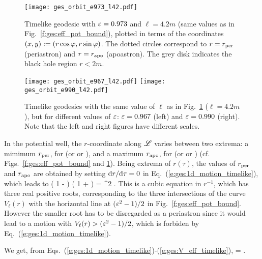 \begin{figure}
\centerline{\texttt{[image: ges\_orbit\_e973\_l42.pdf]}}
\caption[]{\label{f:ges:orbit_e973_l42} \footnotesize
Timelike geodesic with $\varepsilon = 0.973$ and $\ell=4.2m$ (same values as in
Fig.~\ref{f:ges:eff_pot_bound}), plotted in terms of the coordinates
$(x,y) := (r\cos\varphi, r\sin\varphi)$. The dotted circles correspond to $r=r_{\rm per}$
(periastron) and $r=r_{\rm apo}$ (apoastron). The grey disk indicates the
black hole region $r<2m$.
}
\end{figure}

\begin{figure}
\centerline{\texttt{[image: ges\_orbit\_e967\_l42.pdf]}\quad
\texttt{[image: ges\_orbit\_e990\_l42.pdf]}}
\caption[]{\label{f:ges:orbit_e967_990_l42} \footnotesize
Timelike geodesics with the same value of $\ell$ as in Fig.~\ref{f:ges:orbit_e973_l42} ($\ell=4.2m$), but for different values of $\varepsilon$: $\varepsilon = 0.967$ (left) and $\varepsilon=0.990$ (right).
Note that the left and right figures have different scales.
}
\end{figure}


In the potential well, the $r$-coordinate along $\mathscr{L}$ varies between two
extrema: a mimimum $r_{\rm per}$, for  (or  or ), and
a maximum
$r_{\rm apo}$, for 
(or  or ) (cf. Figs.~\ref{f:ges:eff_pot_bound} and \ref{f:ges:orbit_e973_l42}). Being extrema of $r(\tau)$,
the values of $r_{\rm per}$ and $r_{\rm apo}$ are obtained by setting
$\mathrm{d} r /\mathrm{d}\tau =0$ in Eq.~(\ref{e:ges:1d_motion_timelike}), which leads to
\be
    \left( 1 -  \right) \left( 1 +  \right)
        = \veps^2 .
\ee
This is a cubic equation in $r^{-1}$, which has three real positive roots, corresponding
to the three intersections of the curve $V_{\ell}(r)$ with the horizontal
line at $(\varepsilon^2-1)/2$ in Fig.~\ref{f:ges:eff_pot_bound}. However the smaller
root has to be disregarded as a periastron since it would lead to a motion with
$V_{\ell}(r) > (\varepsilon^2-1)/2$, which is forbiden by Eq.~(\ref{e:ges:1d_motion_timelike}).

We get, from Eqs.~(\ref{e:ges:1d_motion_timelike})-(\ref{e:ges:V_eff_timelike}),
\be
     = \pm
     .
\ee

